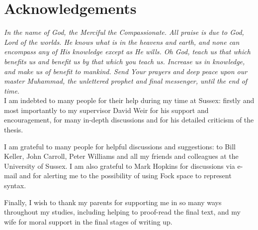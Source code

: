 \documentclass[a4paper,oneside,12pt]{report}
\begin{document}
\onehalfspacing

\chapter*{Acknowledgements}

\textit{In the name of God, the Merciful the Compassionate. All praise is due to God, Lord of the worlds. He knows what is in the heavens and earth, and none can encompass any of His knowledge except as He wills. Oh God, teach us that which benefits us and benefit us by that which you teach us. Increase us in knowledge, and make us of benefit to mankind. Send Your prayers and deep peace upon our master Muhammad, the unlettered prophet and final messenger, until the end of time.}
\vspace{0.5cm}\\
I am indebted to many people for their help during my time at Sussex: firstly and most importantly to my supervisor David Weir for his support and encouragement, for many in-depth discussions and for his detailed criticism of the thesis.

I am grateful to many people for helpful discussions and suggestions: to Bill Keller, John Carroll, Peter Williams and all my friends and colleagues at the University of Sussex. I am also grateful to Mark Hopkins for discussions via e-mail and for alerting me to the possibility of using Fock space to represent syntax. 

Finally, I wish to thank my parents for supporting me in so many ways throughout my studies, including helping to proof-read the final text, and my wife for moral support in the final stages of writing up.







%





\appendix








\printindex
\end{document}
